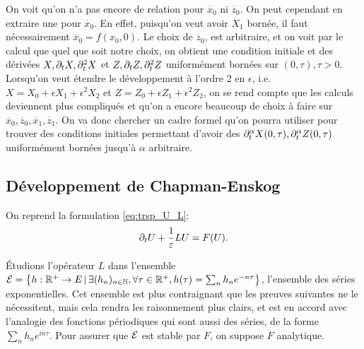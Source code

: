 On voit qu'on n'a pas encore de relation pour $\dot{x_0}$ ni $\dot{z_0}$. On peut cependant en extraire une pour $\dot{x_0}$. 
En effet, puisqu'on veut avoir $X_1$ bornée, il faut nécessairement $\dot{x_0} = f(x_0,0)$. 
Le choix de $\dot{z_0}$, est arbitraire, et on voit par le calcul que quel que soit notre choix, on obtient une condition initiale et des dérivées $X,\partial_t X, \partial_t^2 X$ et $Z,\partial_t Z, \partial_t^2 Z$ uniformément bornées sur $(0,\tau),\tau > 0$. \\

Lorsqu'on veut étendre le développement à l'ordre 2 en $\epsilon$, i.e. $X = X_0 + \epsilon X_1 + \epsilon^2 X_2$ et $Z = Z_0 + \epsilon Z_1 + \epsilon^2 Z_2$, on se rend compte que les calculs deviennent plus compliqués et qu'on a encore beaucoup de choix à faire sur $\ddot{x_0},\ddot{z_0},\dot{x_1},\dot{z_1}$. 
On va donc chercher un cadre formel qu'on pourra utiliser pour trouver des conditions initiales permettant d'avoir des $\partial_t^{\alpha} X(0,\tau), \partial_t^{\alpha} Z(0,\tau)$ uniformément bornées jusqu'à $\alpha$ arbitraire. 


\subsection{Développement de Chapman-Enskog}

On reprend la formulation \eqref{eq:trsp_U_L}:
$$ \partial_t U + \frac{1}{\varepsilon} LU = F(U). $$

\'{E}tudions l'opérateur $L$ dans l'ensemble $\mathcal{E} = \big\{h:\mathbb{R}^+ \rightarrow E \,|\, \exists (h_n)_{n\in\mathbb{N}}, \forall\tau\in\mathbb{R}^+, h(\tau) = \sum_n h_n e^{-n\tau}\big\}$, l'ensemble des séries exponentielles. 
Cet ensemble est plus contraignant que les preuves suivantes ne le nécessitent, mais cela rendra les raisonnement plus clairs, et est en accord avec l'analogie des fonctions périodiques qui sont aussi des séries, de la forme $\sum_n h_n e^{in\tau}$. 
Pour assurer que $\mathcal{E}$ est stable par $F$, on suppose $F$ analytique. 

